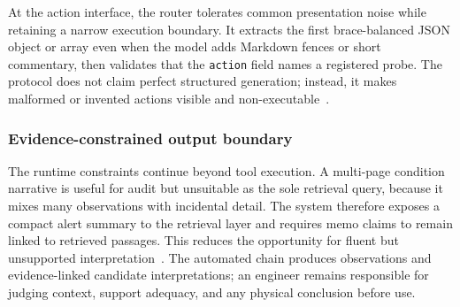 At the action interface, the router tolerates common presentation noise while retaining a narrow execution boundary. It extracts the first brace-balanced JSON object or array even when the model adds Markdown fences or short commentary, then validates that the \texttt{action} field names a registered probe. The protocol does not claim perfect structured generation; instead, it makes malformed or invented actions visible and non-executable~\citep{yao2023react,patil2024gorilla,schick2023toolformer}.

\subsubsection{Evidence-constrained output boundary}
The runtime constraints continue beyond tool execution. A multi-page condition narrative is useful for audit but unsuitable as the sole retrieval query, because it mixes many observations with incidental detail. The system therefore exposes a compact alert summary to the retrieval layer and requires memo claims to remain linked to retrieved passages. This reduces the opportunity for fluent but unsupported interpretation~\citep{ji2023hallucination}. The automated chain produces observations and evidence-linked candidate interpretations; an engineer remains responsible for judging context, support adequacy, and any physical conclusion before use.
